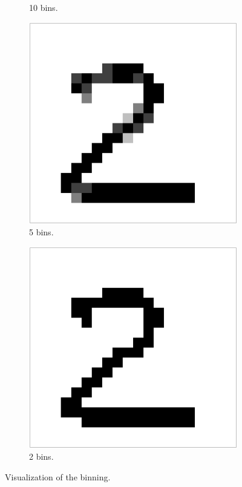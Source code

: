 \begin{figure}[H]
\begin{subfigure}{0.22\textwidth}
        \caption{10 bins.}
    \end{subfigure}
    \begin{subfigure}{0.22\textwidth}
        \includegraphics[width = \textwidth]{graphics/bins_5}
        \caption{5 bins.}
    \end{subfigure}
    \begin{subfigure}{0.22\textwidth}
        \includegraphics[width = \textwidth]{graphics/bins_2}
        \caption{2 bins.}
    \end{subfigure}
\caption{Visualization of the binning.}
\label{fig:effect_of_binning}
\end{figure}


